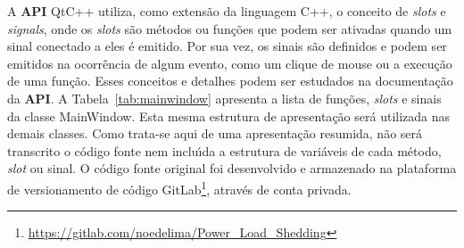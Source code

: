 A \textbf{API} QtC++ utiliza, como extens{\~a}o da linguagem C++, o conceito de \textit{slots} e \textit{signals}, onde os \textit{slots} s{\~a}o m{\'e}todos ou fun{\c c}{\~o}es que podem ser ativadas quando um sinal conectado a eles {\'e} emitido. Por sua vez, os sinais s{\~a}o definidos e podem ser emitidos na ocorr{\^e}ncia de algum evento, como um clique de mouse ou a execu{\c c}{\~a}o de uma fun{\c c}{\~a}o. Esses conceitos e detalhes podem ser estudados na documenta{\c c}{\~a}o da \textbf{API}. A Tabela~\ref{tab:mainwindow} apresenta a lista de fun{\c c}{\~o}es, \textit{slots} e sinais da classe MainWindow. Esta mesma estrutura de apresenta{\c c}{\~a}o ser{\'a} utilizada nas demais classes. Como trata-se aqui de uma apresenta{\c c}{\~a}o resumida, n{\~a}o ser{\'a} transcrito o c{\'o}digo fonte nem inclu{\'\i}da a estrutura de vari{\'a}veis de cada m{\'e}todo, \textit{slot} ou sinal. O c{\'o}digo fonte original foi desenvolvido e armazenado na plataforma de versionamento de c{\'o}digo GitLab\footnote{\url{https://gitlab.com/noedelima/Power_Load_Shedding}}, atrav{\'e}s de conta privada.

